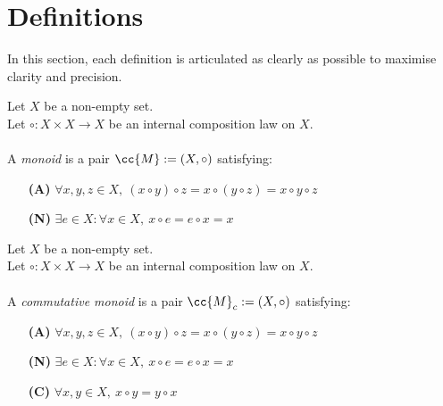 \newpage

\section{Definitions}

In this section, each definition is articulated as clearly as possible to maximise clarity and precision.

\begin{definition-pre}[Monoid]
    \label{def:monoid}
    Let $X$ be a non-empty set.\\
    Let $\circ: X\times X \to X$ be an internal composition law on $X$. \\\\
    A \textit{monoid} is a pair $\cc{M}:= (X, \circ)$ satisfying:
    \begin{enumerate}
        \item [\textbf{(A)}] $\forall x,y,z\in X,\ (x\circ y)\circ z= x\circ (y\circ z) = x\circ y \circ z$
        \item [\textbf{(N)}] $\exists e \in X : \forall x \in X,\ x\circ e = e \circ x = x$
    \end{enumerate}
\end{definition-pre}

\begin{definition-pre}
    \label{def:commutative_monoid}
    Let $X$ be a non-empty set.\\
    Let $\circ: X\times X \to X$ be an internal composition law on $X$. \\\\
    A \textit{commutative monoid} is a pair $\cc{M}_c:= (X, \circ)$ satisfying:
    \begin{enumerate}
        \item [\textbf{(A)}] $\forall x,y,z\in X,\ (x\circ y)\circ z= x\circ (y\circ z) = x\circ y \circ z$
        \item [\textbf{(N)}] $\exists e \in X : \forall x \in X,\ x\circ e = e \circ x = x$
        \item [\textbf{(C)}] $\forall x,y\in X,\ x\circ y = y\circ x$
    \end{enumerate}
\end{definition-pre}

